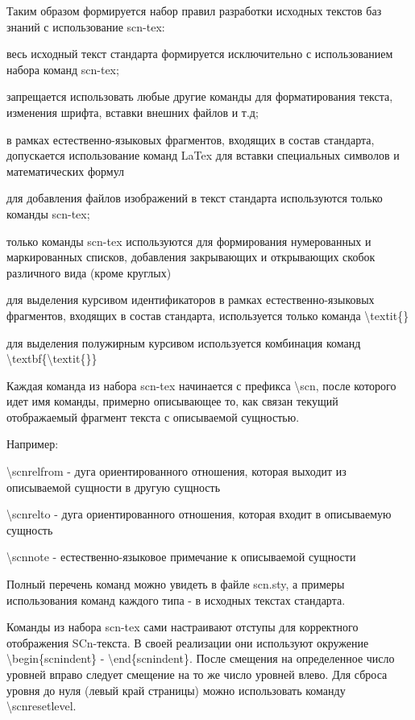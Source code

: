 Таким образом формируется набор правил разработки исходных текстов баз знаний с использование scn-tex:
\begin{textitemize}
	\item весь исходный текст стандарта формируется исключительно с использованием набора команд scn-tex;
	\item запрещается использовать любые другие команды для форматирования текста, изменения шрифта, вставки внешних файлов и т.д;
	\item в рамках естественно-языковых фрагментов, входящих в состав стандарта, допускается использование команд LaTex для вставки специальных символов и математических формул
	\item для добавления файлов изображений в текст стандарта используются только команды scn-tex;
	\item только команды scn-tex используются для формирования нумерованных и маркированных списков, добавления закрывающих и открывающих скобок различного вида (кроме круглых)
	\item для выделения курсивом идентификаторов в рамках естественно-языковых фрагментов, входящих в состав стандарта, используется только команда \textbackslash textit\{\}
	\item для выделения полужирным курсивом используется комбинация команд \textbackslash textbf\{\textbackslash textit\{\}\}
\end{textitemize}

Каждая команда из набора scn-tex начинается с префикса \textbackslash scn, после которого идет имя команды, примерно описывающее то, как связан текущий отображаемый фрагмент текста с описываемой сущностью. 

Например:
\begin{textitemize}
	\item \textbackslash scnrelfrom - дуга ориентированного отношения, которая выходит из описываемой сущности в другую сущность
	\item \textbackslash scnrelto - дуга ориентированного отношения, которая входит в описываемую сущность
	\item \textbackslash scnnote - естественно-языковое примечание к описываемой сущности
\end{textitemize}

Полный перечень команд можно увидеть в файле scn.sty, а примеры использования команд каждого типа - в исходных текстах стандарта.

Команды из набора scn-tex сами настраивают отступы для корректного отображения SCn-текста. В своей реализации они используют окружение \textbackslash begin\{scnindent\} - \textbackslash end\{scnindent\}. После смещения на определенное число уровней вправо следует смещение на то же число уровней влево. Для сброса уровня до нуля (левый край страницы) можно использовать команду \textbackslash scnresetlevel.

